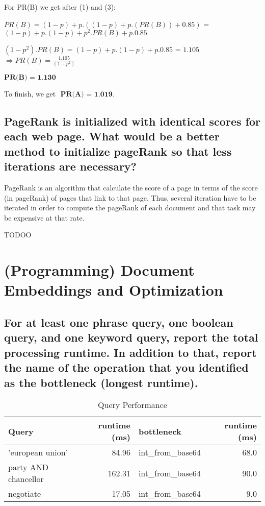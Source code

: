 \documentclass{scrartcl}
\begin{document}
For PR(B) we get after (1) and (3):

$PR(B) = (1 - p) + p.( (1 - p) + p.( PR(B))+ 0.85)$ = $(1-p) + p.(1-p) + p^2.PR(B) + p.0.85$

$(1- p^2). PR(B) = (1 - p) + p. (1-p) + p. 0.85$ = $ 1.105$ $ \Rightarrow PR(B) = \frac{1.105}{(1- p^2)}$

$\textbf{PR(B) = 1.130}$

To finish, we get $\textbf{ PR(A) = 1.019}$.

\subsection { PageRank is initialized with identical scores for each web page. What would be a better
method to initialize pageRank so that less iterations are necessary?}

PageRank is an algorithm that calculate the score of a page in terms of the score (in pageRank) of pages that link to that page. Thus, several iteration have to be iterated in order to compute the pageRank of each document and that task may be expensive at that rate. 

TODOO


\section{(Programming) Document Embeddings and Optimization}

\subsection{For at least one phrase query, one boolean query, and one keyword query, report the total processing runtime. In addition to that, report the name of the operation that you identified as the bottleneck (longest runtime).}

\begin{table}[h]
	\centering
	\caption{Query Performance}
	\begin{tabular}{l|r|l|r}
		Query                & runtime (ms) & bottleneck         & runtime (ms)  \\ \hline
		'european union'     &        84.96 & int\_from\_base64  & 68.0  \\
		party AND chancellor &       162.31 & int\_from\_base64  & 90.0  \\
		negotiate            &        17.05 & int\_from\_base64  &  9.0  \\
	\end{tabular}
\end{table}
\end{document}
